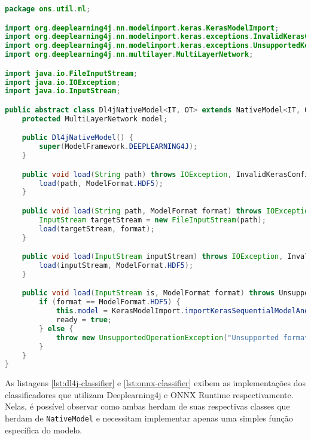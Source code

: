 \begin{lstlisting}[language=Java, caption=Implementação da classe Dl4jNativeModel, label={lst:dl4j-native-model}]
package ons.util.ml;

import org.deeplearning4j.nn.modelimport.keras.KerasModelImport;
import org.deeplearning4j.nn.modelimport.keras.exceptions.InvalidKerasConfigurationException;
import org.deeplearning4j.nn.modelimport.keras.exceptions.UnsupportedKerasConfigurationException;
import org.deeplearning4j.nn.multilayer.MultiLayerNetwork;

import java.io.FileInputStream;
import java.io.IOException;
import java.io.InputStream;

public abstract class Dl4jNativeModel<IT, OT> extends NativeModel<IT, OT> {
    protected MultiLayerNetwork model;

    public Dl4jNativeModel() {
        super(ModelFramework.DEEPLEARNING4J);
    }

    public void load(String path) throws IOException, InvalidKerasConfigurationException, UnsupportedKerasConfigurationException {
        load(path, ModelFormat.HDF5);
    }

    public void load(String path, ModelFormat format) throws IOException, UnsupportedKerasConfigurationException, InvalidKerasConfigurationException {
        InputStream targetStream = new FileInputStream(path);
        load(targetStream, format);
    }

    public void load(InputStream inputStream) throws IOException, InvalidKerasConfigurationException, UnsupportedKerasConfigurationException {
        load(inputStream, ModelFormat.HDF5);
    }

    public void load(InputStream is, ModelFormat format) throws UnsupportedKerasConfigurationException, IOException, InvalidKerasConfigurationException {
        if (format == ModelFormat.HDF5) {
            this.model = KerasModelImport.importKerasSequentialModelAndWeights(is);
            ready = true;
        } else {
            throw new UnsupportedOperationException("Unsupported format");
        }
    }
}
\end{lstlisting}

As listagens \ref{lst:dl4j-classifier} e \ref{lst:onnx-classifier} exibem as implementações dos classificadores que utilizam Deeplearning4j e ONNX Runtime respectivamente. Nelas, é possível observar como ambas herdam de suas respectivas classes que herdam de \texttt{NativeModel} e necessitam implementar apenas uma simples função específica do modelo.

